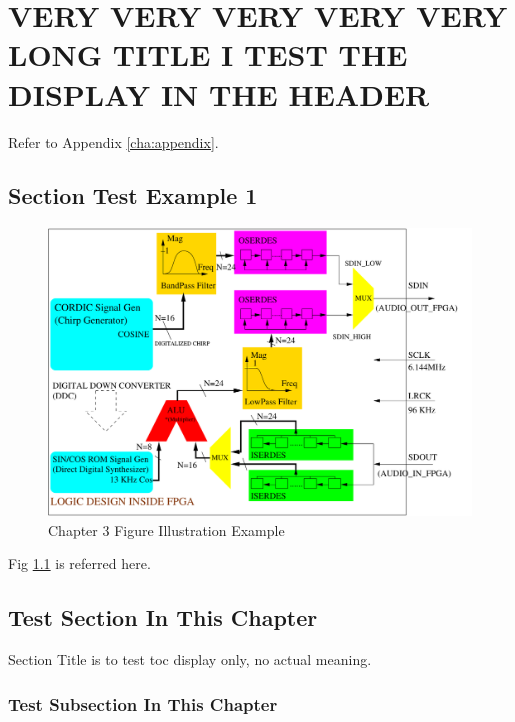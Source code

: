 \chapter[\protect\vspace{-0.5ex}{VERY VERY VERY VERY VERY LONG TITLE I TEST THE DISPLAY IN THE HEADER}]{VERY VERY VERY VERY VERY LONG TITLE I TEST THE DISPLAY IN THE HEADER}
Refer to Appendix \ref{cha:appendix}.

\section{Section Test Example 1}

\begin{figure}[!hbp]
\begin{center}
\includegraphics[width=\textwidth]{graphic/VERILOG_DESIGN_CHIRP.pdf}
\caption{Chapter 3 Figure Illustration Example }
\label{FPGAVerilogOverView}
\end{center}
\end{figure}

Fig \ref{FPGAVerilogOverView} is referred here.

\section{Test Section In This Chapter }
Section Title is to test toc display only, no actual meaning.
\subsection{Test Subsection In This Chapter}
 
